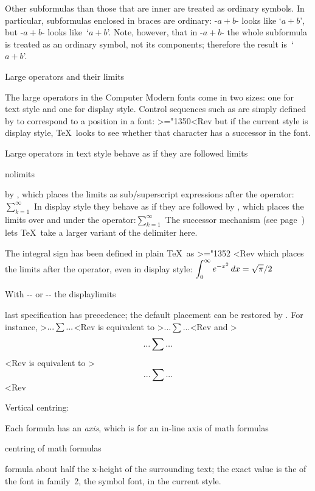 Other subformulas than those that are inner are treated as
ordinary symbols. In particular, subformulas enclosed in
braces are ordinary: \ver-$a+b$- looks like `$a\mathop+b$', but
%
\ver-$a{+}b$- looks like~`$a{+}b$'. Note, however, that
in \ver-${a+b}$- the whole subformula is treated as an
ordinary symbol, not its components; 
therefore the result is~`${a+b}$'.

\point Large operators and their limits

The large operators in the Computer Modern fonts come in
two sizes: one for text style and one for display style.
Control sequences such as  are simply defined by
 to correspond to a position in a font:
\Ver>\mathchardef\sum="1350<Rev but if the
current style is display style, \TeX\ looks to see whether
that character has a successor in the font.

Large operators in text style behave as if they are followed
\csterm limits\par\csterm nolimits\par
by , which places the limits as sub/superscript
expressions after the
operator:\disp$\sum_{k=1}^\infty$\dispstop
In display style they behave as if they are followed by
, which places the limits over and under
the operator:\disp$\displaystyle\sum_{k=1}^\infty$\dispstop
The successor mechanism (see page~\pgref[successor])
\alt
lets \TeX\ take a larger variant
of the delimiter here.

The integral sign has been defined in plain \TeX\ as
\Ver>\mathchardef\intop="1352 \def\int{\intop\nolimits}<Rev
which places the limits after the operator, even in display style:
\disp$\displaystyle\int_0^\infty e^{-x^2}\,dx=\sqrt{\pi}/2$
\dispstop

With \ver-\limits\nolimits- or \ver-\nolimits\limits- the
\csterm displaylimits\par
last specification has precedence; the default placement
can be restored by . For instance,
\Ver>$ ... \sum\limits\displaylimits ... $<Rev
is equivalent to \Ver>$ ... \sum ... $<Rev and 
\Ver>$$ ... \sum\nolimits\displaylimits ... $$<Rev
is equivalent to
\Ver>$$ ... \sum ... $$<Rev

\point Vertical centring: \cs{\vcenter}

Each formula has an {\em axis\/}, which is for an in-line
\term axis of math formulas\par\term centring of math formulas\par
formula about half the x-height of the surrounding
text; the exact value is the  of the
font in family~2, the symbol font, in the current style.

